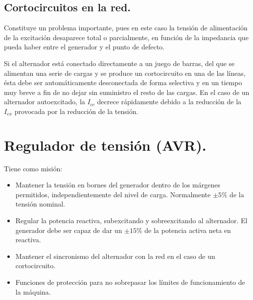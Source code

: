 	\subsection{Cortocircuitos en la red.}	
		Constituye un problema importante, pues en este caso la tensión de alimentación de la excitación desaparece total o parcialmente, en función de la impedancia que pueda haber entre el generador y el punto de defecto.
		
		
		Si el alternador está conectado directamente a un juego de barras, del que se alimentan una serie de cargas y se produce un cortocircuito en una de las líneas, ésta debe ser automáticamente desconectada de forma selectiva y en un tiempo muy breve a fin de no dejar sin suministro el resto de las cargas. En el caso de un alternador autoexcitado, la $I_{cc}$ decrece rápidamente debido a la reducción de la $I_{ex}$ provocada por la reducción de la tensión.
		
	\section{Regulador de tensión (AVR).}
		Tiene como misión:
		\begin{itemize}
			\item Mantener la tensión en bornes del generador dentro de los márgenes permitidos, independientemente del nivel de carga. Normalmente $\pm5\%$ de la tensión nominal.
			\item Regular la potencia reactiva, subexcitando y sobreexcitando al alternador. El generador debe ser capaz de dar un $\pm15\%$ de la potencia activa neta en reactiva.
			\item Mantener el sincronismo del alternador con la red en el caso de un cortocircuito.
			\item Funciones de protección para no sobrepasar los límites de funcionamiento de la máquina.
		\end{itemize}
		
